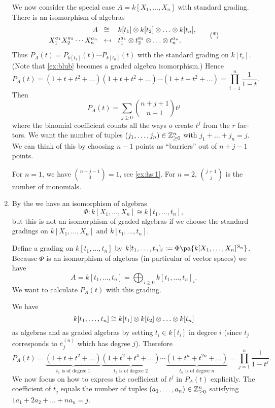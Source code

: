\documentclass[12pt,a4paper]{scrartcl}
\theoremstyle{cplain}
\theoremstyle{cplain}
\theoremstyle{cplain}
\theoremstyle{definition}
\begin{document}
\begin{otherlanguage}{english}
\begin{enumerate}
  We now consider the special case $A = k[X_1,\ldots,X_n]$ with standard grading. There is an isomorphism of algebras
  \begin{equation*}
  \begin{aligned}
    A \;\;&\cong&& k[t_1] \otimes k[t_2] \otimes \ldots \otimes k[t_n], \\
    X_1^{a_1}X_2^{a_2}\cdots X_n^{a_n} \;\;&\mapsfrom&& t_1^{a_1}\otimes t_2^{a_2}\otimes \ldots\otimes t_n^{a_n}.
  \end{aligned} \tag{*}\label{ex:blub}
  \end{equation*}
  Thus $P_A(t) = P_{k[t_1]}(t)\cdots P_{k[t_n]}(t)$ with the standard grading on $k[t_i]$. (Note that \eqref{ex:blub} becomes a graded algebra isomorphism.) Hence \[ P_A(t) = (1+t+t^2+\ldots)(1+t+t^2+\ldots)\cdots(1+t+t^2+\ldots) = \prod_{i=1}^n\frac1{1-t}. \]
  Then \[ P_A(t) = \sum_{j\ge 0}\binom{n+j+1}{n-1} t^j \] where the binomial coefficient counts all the ways o create $t^j$ from the $r$ factors. We want the number of tuples $(j_1,\ldots,j_n) \in \mathbb Z_{\ge 0}^n$ with $j_1+\ldots+j_n = j$. We can think of this by choosing $n-1$ points as \enquote{barriers} out of $n+j-1$ points.
  
  For $n=1$, we have $\binom{n+j-1}0 = 1$, see \ref{ex:hs:1}. For $n=2$, $\binom{j+1}j$ is the number of monomials.
  \item By the  we have an isomorphism of algebras \[ \Phi\colon k[X_1,\ldots,X_n] \cong k[t_1,\ldots,t_n],\] but this is not an isomorphism of graded algebras if we choose the standard gradings on $k[X_1,\ldots,X_n]$ and $k[t_1,\ldots,t_n ]$.
  
  Define a grading on $k[t_1,\ldots,t_n]$ by $k[t_1,\ldots,t_n]_i := \Phi\pa{k[X_1,\ldots,X_n]^{S_n}}$. Because $\Phi$ is an isomorphism of algebras (in particular of vector spaces) we have \[A = k[t_1,\ldots,t_n] = \bigoplus_{i\ge0} k[t_1,\ldots,t_n]_i.\]
  We want to calculate $P_A(t)$ with this grading.
  
  We have \[ k[t_1,\ldots,t_n] \cong k[t_1] \otimes k[t_2] \otimes \ldots \otimes k[t_n] \] as algebras and as graded algebras by setting $t_i \in k[t_i]$ in degree $i$ (since $t_j$ corresponds to $e_j^{(n)}$ which has degree $j$). Therefore \[ P_A(t) = \underbrace{(1+t+t^2+\ldots)}_{\text{$t_1$ is of degree $1$}}\underbrace{(1+t^2+t^4+\ldots)}_{\text{$t_2$ is of degree $2$}}\cdots \underbrace{(1+t^n+t^{2n}+\ldots)}_{\text{$t_n$ is of degree $n$}} = \prod_{j=1}^n\frac1{1-t^j}. \]
  We now focus on how to express the coefficient of $t^j$ in $P_A(t)$ explicitly. The coefficient of $t_j$ equals the number of tuples $(a_1,\ldots,a_n)\in \mathbb Z_{\ge0}^n$ satisfying $1a_1+2a_2+\ldots+na_n = j$.
  

\end{enumerate}
\end{otherlanguage}
\end{document}
